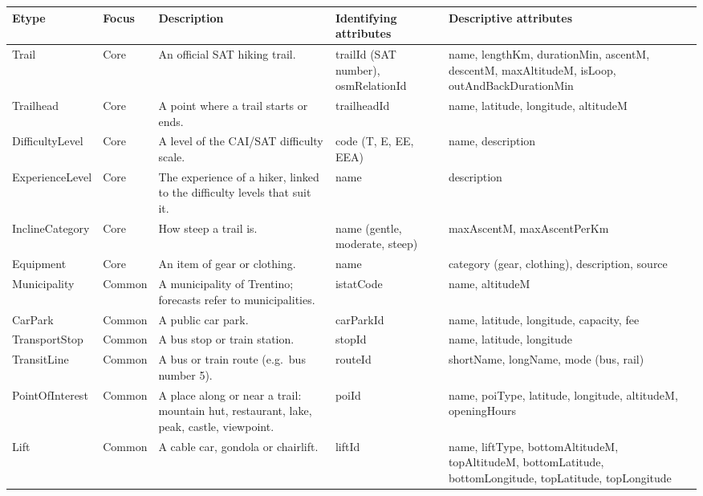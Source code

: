 \begin{table}[htbp]
\centering\footnotesize
\renewcommand{\arraystretch}{1.25}
\begin{tabular}{|>{\raggedright\arraybackslash}p{2.5cm}|>{\raggedright\arraybackslash}p{1.6cm}|>{\raggedright\arraybackslash}p{3.9cm}|>{\raggedright\arraybackslash}p{2.9cm}|>{\raggedright\arraybackslash}p{4.0cm}|}
\hline
\textbf{Etype} & \textbf{Focus} & \textbf{Description} & \textbf{Identifying attributes} & \textbf{Descriptive attributes} \\ \hline
Trail & Core & An official SAT hiking trail. & trailId (SAT number), osmRelationId & name, lengthKm, durationMin, ascentM, descentM, maxAltitudeM, isLoop, outAndBackDurationMin \\ \hline
Trailhead & Core & A point where a trail starts or ends. & trailheadId & name, latitude, longitude, altitudeM \\ \hline
DifficultyLevel & Core & A level of the CAI/SAT difficulty scale. & code (T, E, EE, EEA) & name, description \\ \hline
ExperienceLevel & Core & The experience of a hiker, linked to the difficulty levels that suit it. & name & description \\ \hline
InclineCategory & Core & How steep a trail is. & name (gentle, moderate, steep) & maxAscentM, maxAscentPerKm \\ \hline
Equipment & Core & An item of gear or clothing. & name & category (gear, clothing), description, source \\ \hline
Municipality & Common & A municipality of Trentino; forecasts refer to municipalities. & istatCode & name, altitudeM \\ \hline
CarPark & Common & A public car park. & carParkId & name, latitude, longitude, capacity, fee \\ \hline
TransportStop & Common & A bus stop or train station. & stopId & name, latitude, longitude \\ \hline
TransitLine & Common & A bus or train route (e.g.\ bus number 5). & routeId & shortName, longName, mode (bus, rail) \\ \hline
PointOfInterest & Common & A place along or near a trail: mountain hut, restaurant, lake, peak, castle, viewpoint. & poiId & name, poiType, latitude, longitude, altitudeM, openingHours \\ \hline
Lift & Common & A cable car, gondola or chairlift. & liftId & name, liftType, bottomAltitudeM, topAltitudeM, bottomLatitude, bottomLongitude, topLatitude, topLongitude \\ \hline

\end{tabular}
\end{table}
